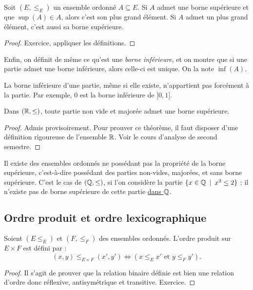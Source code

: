 \begin{proposition}
Soit $(E,\leq_E)$ un ensemble ordonné $A\subseteq E$.
Si $A$ admet une borne supérieure et que $\sup(A) \in A$, alors c'est son plus grand élément.
Si $A$ admet un plus grand élément, c'est aussi sa borne supérieure.
\end{proposition}
\begin{proof}
Exercice, appliquer les définitions.
\end{proof}

Enfin, on définit de même ce qu'est une \emph{borne inférieure}, et on montre que si une partie admet une borne inférieure, alors celle-ci est unique. On la note $\inf(A)$. 

La borne inférieure d'une partie, même si elle existe, n'appartient pas forcément à la partie. Par exemple, $0$ est la borne inférieure de $]0,1]$.

\begin{theoreme}
Dans $(\mathbb{R},\leq)$, toute partie non vide et majorée admet une borne supérieure.
\end{theoreme}
\begin{proof}
Admis provisoirement. Pour prouver ce théorème, il faut disposer d'une définition rigoureuse de l'ensemble $\mathbb{R}$. Voir le cours d'analyse de second semestre.
\end{proof}

Il existe des ensembles ordonnés ne possédant pas la propriété de la borne supérieure, c'est-à-dire possédant des parties non-vides, majorées, et sans borne supérieure. C'est le cas de $(\mathbb{Q},\leq)$, si l'on considère la partie $\{x\in \mathbb{Q}\:\mid\: x^2\leq 2\}$ : il n'existe pas de borne supérieure de cette partie \underline{dans $\mathbb{Q}$}.


\subsection{Ordre produit et ordre lexicographique}

\begin{propdef}
Soient $(E\leq_E)$ et $(F,\leq_F)$ des ensembles ordonnés.
L'ordre produit sur $E\times F$ est défini par :
\[
(x,y) \leq_{E\times F} (x',y') \iff \left(x\leq_E x' \text{ et } y\leq_F y'\right).
\]
\end{propdef}
\begin{proof}
Il s'agit de prouver que la relation binaire définie est bien une relation d'ordre donc réflexive, antisymétrique et transitive. Exercice.
\end{proof}

